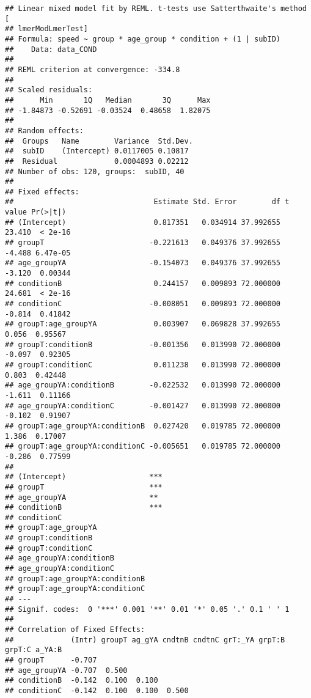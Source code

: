\documentclass[]{article}
\begin{document}
\begin{verbatim}
## Linear mixed model fit by REML. t-tests use Satterthwaite's method [
## lmerModLmerTest]
## Formula: speed ~ group * age_group * condition + (1 | subID)
##    Data: data_COND
## 
## REML criterion at convergence: -334.8
## 
## Scaled residuals: 
##      Min       1Q   Median       3Q      Max 
## -1.84873 -0.52691 -0.03524  0.48658  1.82075 
## 
## Random effects:
##  Groups   Name        Variance  Std.Dev.
##  subID    (Intercept) 0.0117005 0.10817 
##  Residual             0.0004893 0.02212 
## Number of obs: 120, groups:  subID, 40
## 
## Fixed effects:
##                                Estimate Std. Error        df t value Pr(>|t|)
## (Intercept)                    0.817351   0.034914 37.992655  23.410  < 2e-16
## groupT                        -0.221613   0.049376 37.992655  -4.488 6.47e-05
## age_groupYA                   -0.154073   0.049376 37.992655  -3.120  0.00344
## conditionB                     0.244157   0.009893 72.000000  24.681  < 2e-16
## conditionC                    -0.008051   0.009893 72.000000  -0.814  0.41842
## groupT:age_groupYA             0.003907   0.069828 37.992655   0.056  0.95567
## groupT:conditionB             -0.001356   0.013990 72.000000  -0.097  0.92305
## groupT:conditionC              0.011238   0.013990 72.000000   0.803  0.42448
## age_groupYA:conditionB        -0.022532   0.013990 72.000000  -1.611  0.11166
## age_groupYA:conditionC        -0.001427   0.013990 72.000000  -0.102  0.91907
## groupT:age_groupYA:conditionB  0.027420   0.019785 72.000000   1.386  0.17007
## groupT:age_groupYA:conditionC -0.005651   0.019785 72.000000  -0.286  0.77599
##                                  
## (Intercept)                   ***
## groupT                        ***
## age_groupYA                   ** 
## conditionB                    ***
## conditionC                       
## groupT:age_groupYA               
## groupT:conditionB                
## groupT:conditionC                
## age_groupYA:conditionB           
## age_groupYA:conditionC           
## groupT:age_groupYA:conditionB    
## groupT:age_groupYA:conditionC    
## ---
## Signif. codes:  0 '***' 0.001 '**' 0.01 '*' 0.05 '.' 0.1 ' ' 1
## 
## Correlation of Fixed Effects:
##             (Intr) groupT ag_gYA cndtnB cndtnC grT:_YA grpT:B grpT:C a_YA:B
## groupT      -0.707                                                         
## age_groupYA -0.707  0.500                                                  
## conditionB  -0.142  0.100  0.100                                           
## conditionC  -0.142  0.100  0.100  0.500                                    

\end{verbatim}
\end{document}
